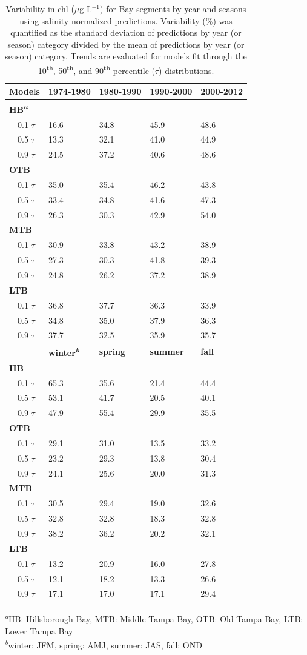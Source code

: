 \documentclass{svjour3}\usepackage[]{graphicx}\usepackage[]{color}
\newcommand{\mugl}{$\mu$g L$^{-1}$}
\begin{document}
\begin{table}[!tbp]
\caption{Variability in \ac{chl} (\mugl) for Bay segments by year and seasons using salinity-normalized predictions.  Variability (\%) was quantified as the standard deviation of predictions by year (or season) category divided by the mean of predictions by year (or season) category.  Trends are evaluated for models fit through the 10\textsuperscript{th}, 50\textsuperscript{th}, and 90\textsuperscript{th} percentile ($\tau$) distributions.\label{tab:nrmcv}} 
\begin{center}
\begin{tabular}{lllll}
\hline\hline
\multicolumn{1}{l}{{\bf Models}}&\multicolumn{1}{c}{{\bf 1974-1980}}&\multicolumn{1}{c}{{\bf 1980-1990}}&\multicolumn{1}{c}{{\bf 1990-2000}}&\multicolumn{1}{c}{{\bf 2000-2012}}\tabularnewline
\hline
{\bfseries HB\textsuperscript{\textit{a}}}&&&&\tabularnewline
~~0.1 $\tau$&16.6&34.8&45.9&48.6\tabularnewline
~~0.5 $\tau$&13.3&32.1&41.0&44.9\tabularnewline
~~0.9 $\tau$&24.5&37.2&40.6&48.6\tabularnewline
\hline
{\bfseries OTB}&&&&\tabularnewline
~~0.1 $\tau$&35.0&35.4&46.2&43.8\tabularnewline
~~0.5 $\tau$&33.4&34.8&41.6&47.3\tabularnewline
~~0.9 $\tau$&26.3&30.3&42.9&54.0\tabularnewline
\hline
{\bfseries MTB}&&&&\tabularnewline
~~0.1 $\tau$&30.9&33.8&43.2&38.9\tabularnewline
~~0.5 $\tau$&27.3&30.3&41.8&39.3\tabularnewline
~~0.9 $\tau$&24.8&26.2&37.2&38.9\tabularnewline
\hline
{\bfseries LTB}&&&&\tabularnewline
~~0.1 $\tau$&36.8&37.7&36.3&33.9\tabularnewline
~~0.5 $\tau$&34.8&35.0&37.9&36.3\tabularnewline
~~0.9 $\tau$&37.7&32.5&35.9&35.7\tabularnewline
\hline
~~&{\bf winter\textsuperscript{\textit{b}}}&{\bf spring}&{\bf summer}&{\bf fall}\tabularnewline
\hline
{\bfseries HB}&&&&\tabularnewline
~~0.1 $\tau$&65.3&35.6&21.4&44.4\tabularnewline
~~0.5 $\tau$&53.1&41.7&20.5&40.1\tabularnewline
~~0.9 $\tau$&47.9&55.4&29.9&35.5\tabularnewline
\hline
{\bfseries OTB}&&&&\tabularnewline
~~0.1 $\tau$&29.1&31.0&13.5&33.2\tabularnewline
~~0.5 $\tau$&23.2&29.3&13.8&30.4\tabularnewline
~~0.9 $\tau$&24.1&25.6&20.0&31.3\tabularnewline
\hline
{\bfseries MTB}&&&&\tabularnewline
~~0.1 $\tau$&30.5&29.4&19.0&32.6\tabularnewline
~~0.5 $\tau$&32.8&32.8&18.3&32.8\tabularnewline
~~0.9 $\tau$&38.2&36.2&20.2&32.1\tabularnewline
\hline
{\bfseries LTB}&&&&\tabularnewline
~~0.1 $\tau$&13.2&20.9&16.0&27.8\tabularnewline
~~0.5 $\tau$&12.1&18.2&13.3&26.6\tabularnewline
~~0.9 $\tau$&17.1&17.0&17.1&29.4\tabularnewline
\hline
\end{tabular}\end{center}

\footnotesize \textsuperscript{\textit{a}}HB: Hillsborough Bay, MTB: Middle Tampa Bay, OTB: Old Tampa Bay, LTB: Lower Tampa Bay\\\textsuperscript{\textit{b}}winter: JFM, spring: AMJ, summer: JAS, fall: OND\end{table}
\end{document}

